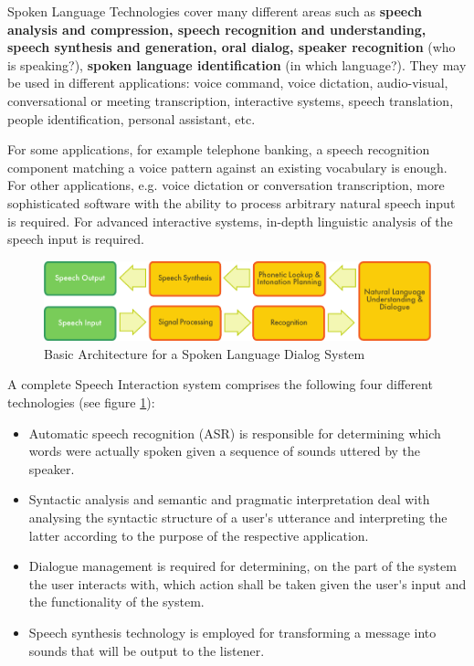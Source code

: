 \begin{multicols}{2}
Spoken Language Technologies cover many different areas such as 
{\bf speech analysis and compression, speech recognition and
  understanding, speech synthesis and generation, oral dialog, speaker
  recognition} (who is speaking?), {\bf spoken language
  identification} (in which language?). They may be used in different
applications: voice command, voice dictation, audio-visual,
conversational or meeting transcription, interactive systems, speech
translation, people identification, personal assistant, etc.

For some applications, for example telephone banking, a speech
recognition component matching a voice pattern against an existing
vocabulary is enough. For other applications, e.g. voice dictation or
conversation transcription, more sophisticated software with the
ability to process arbitrary natural speech input is required. For
advanced interactive systems, in-depth linguistic analysis of the
speech input is required.


\begin{figure}
\begin{center}
 \includegraphics[width=\textwidth]{../_media/english/simple_speech-based_dialogue_architecture} 
\caption{Basic Architecture for a Spoken Language Dialog System}
\label{fig:sldsEng}
\end{center}
\end{figure}

A complete Speech Interaction system comprises the following four
different technologies (see figure \ref{fig:sldsEng}):
\begin{itemize}
\item Automatic speech recognition (ASR) is responsible for
  determining which words were actually spoken given a sequence of
  sounds uttered by the speaker.
\item Syntactic analysis and semantic and pragmatic interpretation
  deal with analysing the syntactic structure of a user{\mbox '}s utterance
  and interpreting the latter according to the purpose of the
  respective application.
\item Dialogue management is required for determining, on the part of
  the system the user interacts with, which action shall be taken
  given the user{\mbox '}s input and the functionality of the system.
\item Speech synthesis technology is employed for transforming a
  message into sounds that will be output to the listener.
\end{itemize}


\end{multicols}
